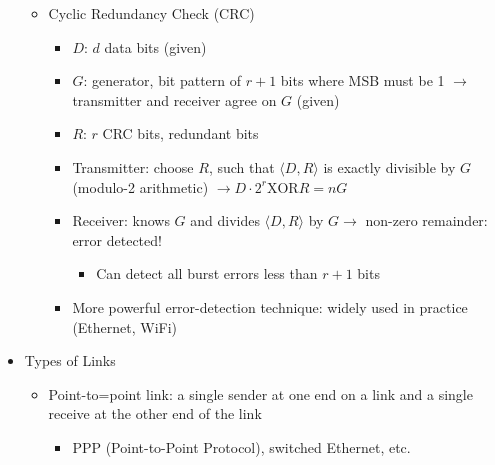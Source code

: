 \begin{itemize}
\begin{itemize}
      \item Cyclic Redundancy Check (CRC)

        \begin{itemize}

          \item $D$: $d$ data bits (given)

          \item $G$: generator, bit pattern of $r+1$ bits where MSB must be 1 $\to$ transmitter and receiver agree on $G$ (given)

          \item $R$: $r$ CRC bits, redundant bits

          \item Transmitter: choose $R$, such that $\langle D,R\rangle$ is exactly divisible by $G$ (modulo-2 arithmetic) $\to D\cdot2^r\text{XOR}R=nG$

          \item Receiver: knows $G$ and divides $\langle D,R\rangle$ by $G\to$ non-zero remainder: error detected!

            \begin{itemize}

              \item Can detect all burst errors less than $r+1$ bits

            \end{itemize}

          \item More powerful error-detection technique: widely used in practice (Ethernet,  WiFi)

        \end{itemize}

    \end{itemize}

  \item Types of Links

    \begin{itemize}

      \item Point-to=point link: a single sender at one end on a link and a single receive at the other end of the link

        \begin{itemize}

          \item PPP (Point-to-Point Protocol), switched Ethernet, etc.

        \end{itemize}


\end{itemize}
\end{itemize}
